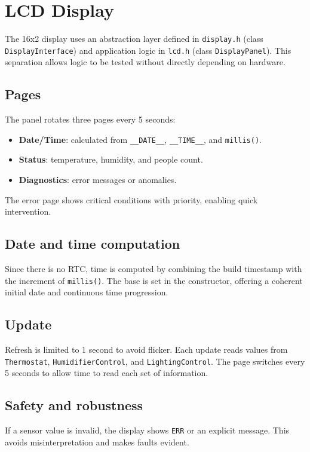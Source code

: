 \chapter{LCD Display}

The 16x2 display uses an abstraction layer defined in \texttt{display.h} (class \texttt{DisplayInterface}) and application logic in \texttt{lcd.h} (class \texttt{DisplayPanel}). This separation allows logic to be tested without directly depending on hardware.

\section{Pages}
The panel rotates three pages every 5 seconds:
\begin{itemize}
  \item \textbf{Date/Time}: calculated from \texttt{\_\_DATE\_\_}, \texttt{\_\_TIME\_\_}, and \texttt{millis()}.
  \item \textbf{Status}: temperature, humidity, and people count.
  \item \textbf{Diagnostics}: error messages or anomalies.
\end{itemize}
The error page shows critical conditions with priority, enabling quick intervention.

\section{Date and time computation}
Since there is no RTC, time is computed by combining the build timestamp with the increment of \texttt{millis()}. The base is set in the constructor, offering a coherent initial date and continuous time progression.

\section{Update}
Refresh is limited to 1 second to avoid flicker. Each update reads values from \texttt{Thermostat}, \texttt{HumidifierControl}, and \texttt{LightingControl}. The page switches every 5 seconds to allow time to read each set of information.

\section{Safety and robustness}
If a sensor value is invalid, the display shows \texttt{ERR} or an explicit message. This avoids misinterpretation and makes faults evident.
